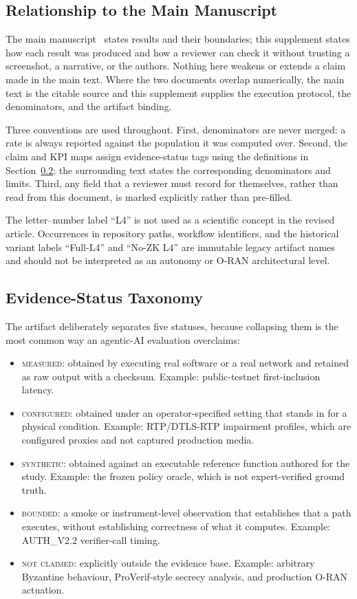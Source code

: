 \documentclass[journal]{IEEEtran}
\newif\ifshowrevisions
\newcommand{\rev}[1]{{\ifshowrevisions\color{blue}\else\color{black}\fi #1}}
\newcommand{\Emeasured}{\textsc{measured}}
\newcommand{\Econfigured}{\textsc{configured}}
\newcommand{\Esynthetic}{\textsc{synthetic}}
\newcommand{\Ebounded}{\textsc{bounded}}
\newcommand{\Eabsent}{\textsc{not claimed}}
\begin{document}
\subsection{Relationship to the Main Manuscript}
The main manuscript~\rev{\cite{mainpaper}} states results and their boundaries; this supplement
states how each result was produced and how a reviewer can check it without
trusting a screenshot, a narrative, or the authors. Nothing here weakens or
extends a claim made in the main text. Where the two documents overlap
numerically, the main text is the citable source and this supplement supplies
the execution protocol, the denominators, and the artifact binding.

Three conventions are used throughout. First, denominators are never merged:
a rate is always reported against the population it was computed over.
\rev{Second, the claim and KPI maps assign evidence-status tags using the
definitions in Section~\ref{sec:status}; the surrounding text states the
corresponding denominators and limits.} Third, any field that a reviewer must
record for themselves, rather than read from this document, is marked
explicitly rather than pre-filled.

The letter--number label ``L4'' is not used as a scientific concept in the
revised article. Occurrences in repository paths, workflow identifiers, and
the historical variant labels ``Full-L4'' and ``No-ZK L4'' are immutable
legacy artifact names and should not be interpreted as an autonomy or O-RAN
architectural level.

\subsection{Evidence-Status Taxonomy}
\label{sec:status}
The artifact deliberately separates five statuses, because collapsing them is
the most common way an agentic-AI evaluation overclaims:

\begin{itemize}
\item \Emeasured{}: obtained by executing real software or a real network and
retained as raw output with a checksum. Example: public-testnet
first-inclusion latency.
\item \Econfigured{}: obtained under an operator-specified setting that stands
in for a physical condition. Example: RTP/DTLS-RTP impairment profiles, which
are configured proxies and not captured production media.
\item \Esynthetic{}: obtained against an executable reference function
authored for the study. Example: the frozen policy oracle, which is not
expert-verified ground truth.
\item \Ebounded{}: a smoke or instrument-level observation that establishes
that a path executes, without establishing correctness of what it computes.
Example: AUTH\_V2.2 verifier-call timing.
\item \Eabsent{}: explicitly outside the evidence base. Example: arbitrary
Byzantine behaviour, ProVerif-style secrecy analysis, and production O-RAN
actuation.
\end{itemize}
\end{document}
